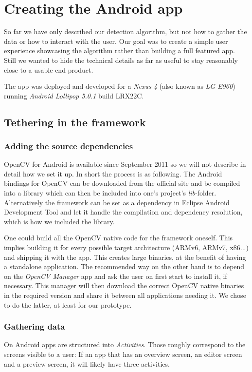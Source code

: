 
\chapter{Creating the Android app}
\label{android}
	So far we have only described our detection algorithm, but not how to gather the data or how to interact with the user. Our goal was to create a simple user experience showcasing the algorithm rather than building a full featured app. Still we wanted to hide the technical details as far as useful to stay reasonably close to a usable end product.

	The app was deployed and developed for a \textit{Nexus 4} (also known as \textit{LG-E960}) running \textit{Android Lollipop 5.0.1} build LRX22C.

	\section{Tethering in the framework}
	\label{android-framework}
	\subsection{Adding the source dependencies}
	\label{android-framework-dependencies}
	OpenCV for Android is available since September 2011 so we will not describe in detail how we set it up. In short the process is as following. The Android bindings for OpenCV can be downloaded from the official site and be compiled into a library which can then be included into one's project's \textit{lib}-folder. Alternatively the framework can be set as a dependency in Eclipse Android Development Tool and let it handle the compilation and dependency resolution, which is how we included the library.

	One could build all the OpenCV native code for the framework oneself. This implies building it for every possible target architecture (ARMv6, ARMv7, x86...) and shipping it with the app. This creates large binaries, at the benefit of having a standalone application. The recommended way on the other hand is to depend on the \textit{OpenCV Manager} app and ask the user on first start to install it, if necessary. This manager will then download the correct OpenCV native binaries in the required version and share it between all applications needing it. We chose to do the latter, at least for our prototype.

	\subsection{Gathering data}
	\label{android-framework-gathering}
	On Android apps are structured into \textit{Activities}. Those roughly correspond to the screens visible to a user: If an app that has an overview screen, an editor screen and a preview screen, it will likely have three activities.

